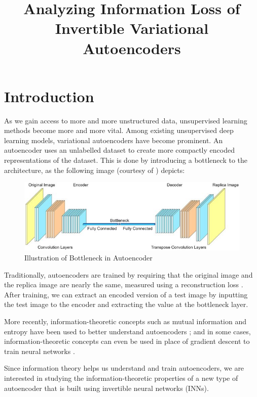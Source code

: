 \documentclass[12pt,letterpaper]{article}
\title{Analyzing Information Loss of Invertible Variational Autoencoders}
\author{\name}
\begin{document}
\maketitle
{}
\pagebreak

\section{Introduction}
As we gain access to more and more unstructured data, unsupervised learning methods become more and more vital.
Among existing unsupervised deep learning models, variational autoencoders have become prominent.
An autoencoder uses an unlabelled dataset to create more compactly encoded representations of the dataset.
This is done by introducing a bottleneck to the architecture, as the following image (courtesy of \cite{bottleneck_picture}) depicts:
\begin{figure}[!htb]
\begin{center}
   \includegraphics[width=0.9\linewidth]{./pics/bottleneck.jpg}
   \caption{Illustration of Bottleneck in Autoencoder}
\end{center}
\end{figure}

Traditionally, autoencoders are trained by requiring that the original image and the replica image are nearly the same, measured using a reconstruction loss \cite{VAEtutorial}.
After training, we can extract an encoded version of a test image by inputting the test image to the encoder and extracting the value at the bottleneck layer.

More recently, information-theoretic concepts such as mutual information and entropy have been used to better understand autoencoders \cite{infotheoretic_vaes}; and in some cases, information-theoretic concepts can even be used in place of gradient descent to train neural networks \cite{deep_infomax}.

Since information theory helps us understand and train autoencoders, we are interested in studying the information-theoretic properties of a new type of autoencoder that is built using invertible neural networks (INNs).
\end{document}
